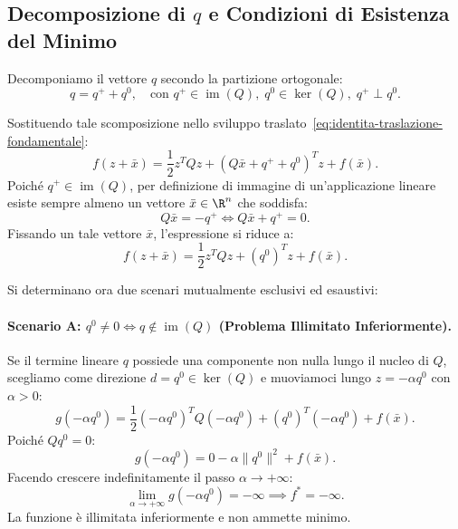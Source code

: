 \subsection{Decomposizione di \texorpdfstring{$q$}{q} e Condizioni di Esistenza del Minimo}
Decomponiamo il vettore $q$ secondo la partizione ortogonale:
\begin{equation}
    q = q^+ + q^0, \quad \text{con } q^+ \in \operatorname{im}(Q), \; q^0 \in \ker(Q), \; q^+ \perp q^0.
\end{equation}

Sostituendo tale scomposizione nello sviluppo traslato~\eqref{eq:identita-traslazione-fondamentale}:
\begin{equation}
    f(z + \bar{x}) = \frac{1}{2} z^T Q z + (Q \bar{x} + q^+ + q^0)^T z + f(\bar{x}).
\end{equation}
Poich\'e $q^+ \in \operatorname{im}(Q)$, per definizione di immagine di un'applicazione lineare esiste sempre almeno un vettore $\bar{x} \in \R^n$ che soddisfa:
\begin{equation}
    Q \bar{x} = -q^+ \iff Q \bar{x} + q^+ = 0.
\end{equation}
Fissando un tale vettore $\bar{x}$, l'espressione si riduce a:
\begin{equation}
    f(z + \bar{x}) = \frac{1}{2} z^T Q z + (q^0)^T z + f(\bar{x}).
    \label{eq:ridotta-singolare}
\end{equation}

Si determinano ora due scenari mutualmente esclusivi ed esaustivi:

\paragraph{Scenario A: $q^0 \neq 0 \iff q \notin \operatorname{im}(Q)$ (Problema Illimitato Inferiormente).}
Se il termine lineare $q$ possiede una componente non nulla lungo il nucleo di $Q$, scegliamo come direzione $d = q^0 \in \ker(Q)$ e muoviamoci lungo $z = -\alpha q^0$ con $\alpha > 0$:
\begin{equation}
    g(-\alpha q^0) = \frac{1}{2} (-\alpha q^0)^T Q (-\alpha q^0) + (q^0)^T (-\alpha q^0) + f(\bar{x}).
\end{equation}
Poich\'e $Q q^0 = 0$:
\begin{equation}
    g(-\alpha q^0) = 0 - \alpha \|q^0\|^2 + f(\bar{x}).
\end{equation}
Facendo crescere indefinitamente il passo $\alpha \to +\infty$:
\begin{equation}
    \lim_{\alpha \to +\infty} g(-\alpha q^0) = -\infty \implies f^* = -\infty.
\end{equation}
La funzione \`e illimitata inferiormente e non ammette minimo.

